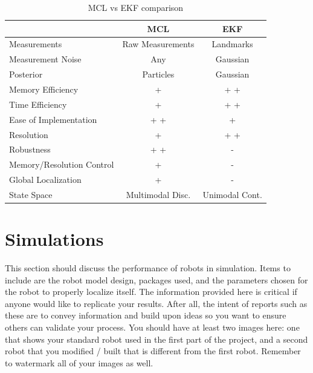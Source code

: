 \documentclass[10pt,journal,compsoc]{IEEEtran}
\begin{document}
\begin{table}[h]
\caption{MCL vs EKF comparison}
\label{tab:mcl_ekf_comparison}
\begin{center}
\begin{tabular}{|l||c|c|}
\hline
& MCL & EKF\\ \hline \hline
Measurements & Raw Measurements & Landmarks \\ \hline
Measurement Noise &  Any &  Gaussian \\ \hline
Posterior &  Particles & Gaussian \\ \hline
Memory Efficiency & +  & + +  \\ \hline
Time Efficiency&  +  & + +  \\ \hline
Ease of Implementation & + +  & +  \\ \hline
Resolution & +  & + + \\ \hline
Robustness & + +  & - \\ \hline
Memory/Resolution Control & +  & - \\ \hline
Global Localization & +  & - \\ \hline
State Space &  Multimodal Disc. & Unimodal Cont. \\ \hline
\end{tabular}
\end{center}
\end{table}

\section{Simulations}





This section should discuss the performance of robots in simulation. Items to include are the robot model design, packages used, and the parameters chosen for the robot to properly localize itself. The information provided here is critical if anyone would like to replicate your results. After all, the intent of reports such as these are to convey information and build upon ideas so you want to ensure others can validate your process.
You should have at least two images here: one that shows your standard robot used in the first part of the project, and a second robot that you modified / built that is different from the first robot. Remember to watermark all of your images as well. 
\end{document}
